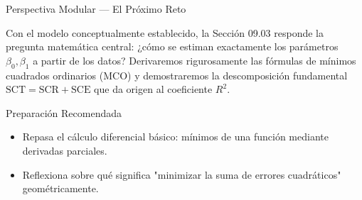 \documentclass[10pt, aspectratio=169]{beamer}
\begin{document}
\begin{frame}{Perspectiva Modular --- El Próximo Reto}
  \scriptsize
  \begin{retoclase}
    Con el modelo conceptualmente establecido, la Sección 09.03 responde la pregunta matemática central: ¿cómo se estiman exactamente los parámetros $\beta_0,\beta_1$ a partir de los datos? Derivaremos rigurosamente las fórmulas de mínimos cuadrados ordinarios (MCO) y demostraremos la descomposición fundamental $\text{SCT}=\text{SCR}+\text{SCE}$ que da origen al coeficiente $R^2$.
  \end{retoclase}

  \vspace{0.08cm}
  \pause
  \begin{alertblock}{Preparación Recomendada}
    \begin{itemize}\itemsep=0.06cm
      \item Repasa el cálculo diferencial básico: mínimos de una función mediante derivadas parciales.
      \item Reflexiona sobre qué significa "minimizar la suma de errores cuadráticos" geométricamente.
    \end{itemize}
  \end{alertblock}
\end{frame}
\end{document}
